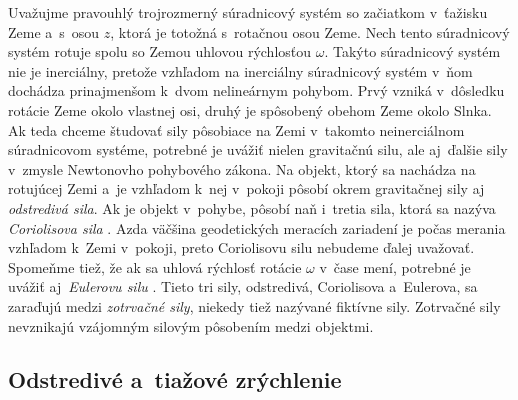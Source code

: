 \documentclass[a4paper,12pt]{book}
\begin{document}
Uvažujme pravouhlý trojrozmerný súradnicový systém so začiatkom v~ťažisku Zeme 
a~s~osou $z$, ktorá je totožná s~rotačnou osou Zeme.  Nech tento súradnicový 
systém rotuje spolu so Zemou uhlovou rýchlosťou $\omega$.  Takýto súradnicový 
systém nie je inerciálny, pretože vzhľadom na inerciálny súradnicový systém 
v~ňom dochádza prinajmenšom k~dvom nelineárnym pohybom.  Prvý vzniká v~dôsledku 
rotácie Zeme okolo vlastnej osi, druhý je spôsobený obehom Zeme okolo Slnka.  
Ak teda chceme študovať sily pôsobiace na Zemi v~takomto neinerciálnom 
súradnicovom systéme, potrebné je uvážiť nielen gravitačnú silu, ale aj~ďalšie 
sily v~zmysle Newtonovho pohybového zákona.  Na objekt, ktorý sa nachádza na 
rotujúcej Zemi a~je vzhľadom k~nej v~pokoji pôsobí okrem gravitačnej sily aj 
\emph{odstredivá sila}.  Ak je objekt v~pohybe, pôsobí naň i~tretia sila, ktorá 
sa nazýva \emph{Coriolisova sila} 
\parencite{Torge1989,SansoGeoidDetermination}.  Azda väčšina geodetických 
meracích zariadení je počas merania vzhľadom k~Zemi v~pokoji, preto Coriolisovu 
silu nebudeme ďalej uvažovať.  Spomeňme tiež, že ak sa uhlová rýchlosť rotácie 
$\omega$ v~čase mení, potrebné je uvážiť aj~\emph{Eulerovu silu} 
\parencite{Torge1989,SansoGeoidDetermination}.  Tieto tri sily, odstredivá, 
Coriolisova a~Eulerova, sa zaraďujú medzi \emph{zotrvačné sily}, niekedy tiež 
nazývané fiktívne sily.  Zotrvačné sily nevznikajú vzájomným silovým pôsobením 
medzi objektmi.






\subsection{Odstredivé a~tiažové zrýchlenie}
\end{document}
